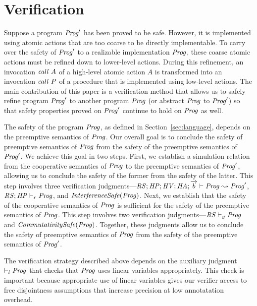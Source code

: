 \section{Verification}
\label{sec:verification}

Suppose a program $\mathit{Prog}'$ has been proved to be safe.
However, it is implemented using atomic actions that are too coarse to be directly implementable.  
To carry over the safety of $\mathit{Prog}'$ to a realizable implementation $\mathit{Prog}$, 
these coarse atomic actions must be refined down to lower-level actions.
During this refinement, an invocation $\mathit{call}\ A$ of a high-level atomic action $A$ is transformed into an 
invocation $\mathit{call}\ P$ of a procedure that is implemented using low-level actions.
The main contribution of this paper is a verification method that allows us to safely refine
program $\mathit{Prog}'$ to another program $\mathit{Prog}$ (or abstract $\mathit{Prog}$ to $\mathit{Prog}'$) so that 
safety properties proved on $\mathit{Prog}'$ continue to hold on $\mathit{Prog}$ as well.

The safety of the program $\mathit{Prog}$, as defined in Section~\ref{sec:language}, depends on 
the preemptive semantics of $\mathit{Prog}$.
Our overall goal is to conclude the safety of preemptive semantics of $\mathit{Prog}$
from the safety of the preemptive semantics of $\mathit{Prog}'$.
We achieve this goal in two steps.
First, we establish a simulation relation from the cooperative semantics of $\mathit{Prog}$ 
to the preemptive semantics of $\mathit{Prog}'$,
allowing us to conclude the safety of the former from the safety of the latter.
This step involves three verification judgments---$\mathit{RS};\mathit{HP};\mathit{HV};\mathit{HA};\overrightarrow{b} \vdash \mathit{Prog} \leadsto \mathit{Prog}'$,
$\mathit{RS};\mathit{HP} \vdash_r \mathit{Prog}$, and $\mathit{InterferenceSafe}(\mathit{Prog})$.
Next, we establish that the safety of the cooperative semantics of $\mathit{Prog}$ is 
sufficient for the safety of the preemptive semantics of $\mathit{Prog}$.
This step involves two verification judgments---$\mathit{RS} \vdash_y \mathit{Prog}$ and $\mathit{CommutativitySafe}(\mathit{Prog})$.
Together, these judgments allow us to conclude the safety of preemptive semantics of $\mathit{Prog}$
from the safety of the preemptive semantics of $\mathit{Prog}'$.

The verification strategy described above depends on the auxiliary judgment $\vdash_l \mathit{Prog}$ that
checks that $\mathit{Prog}$ uses linear variables appropriately.
This check is important because appropriate use of linear variables gives our verifier access to free disjointness
assumptions that increase precision at low annotatation overhead.

